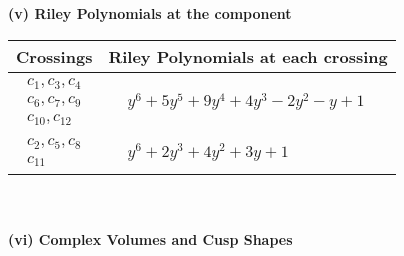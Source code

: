 \documentclass[1p]{elsarticle_modified}
\theoremstyle{definition}
\begin{document}
\newpage\renewcommand{\arraystretch}{1}
\flushleft \textbf{(v) Riley Polynomials at the component}\newline \\
\begin{tabular}{m{50pt}|m{274pt}}
Crossings & \hspace{64pt}Riley Polynomials at each crossing \\
\hline $$\begin{aligned}c_{1},c_{3},c_{4}\\c_{6},c_{7},c_{9}\\c_{10},c_{12}\end{aligned}$$&$\begin{aligned}
&y^6+5 y^5+9 y^4+4 y^3-2 y^2- y+1
\end{aligned}$\\
\hline $$\begin{aligned}c_{2},c_{5},c_{8}\\c_{11}\end{aligned}$$&$\begin{aligned}
&y^6+2 y^3+4 y^2+3 y+1
\end{aligned}$\\
\hline
\end{tabular}\\~\\
\newpage\flushleft \textbf{(vi) Complex Volumes and Cusp Shapes}
\end{document}
